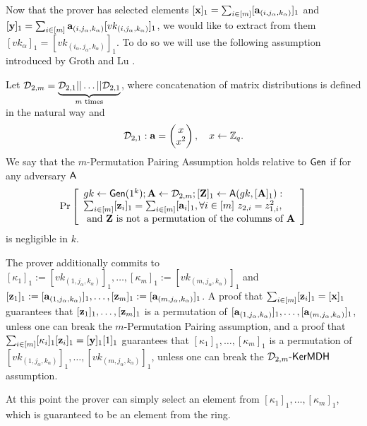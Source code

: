 Now that the prover has selected elements $[\mathbf{x}]_1=\sum_{i\in[m]}[\mathbf{a}_{(i,j_\alpha,k_\alpha)}]_1$ and $[\mathbf{y}]_1=\sum_{i\in[m]}\mathbf{a}_{(i,j_\alpha,k_\alpha)}[vk_{(i,j_\alpha,k_\alpha)}]_1$, we would like to extract from them  $[vk_\alpha]_1=[vk_{(i_\alpha,j_\alpha,k_\alpha)}]_1$. To do so we will use the following assumption introduced by Groth and Lu \cite{AC:GroLu07}.

\begin{definition}
Let $\mathcal{D}_{2,m}=\underbrace{\mathcal{D}_{2,1}||\ldots||\mathcal{D}_{2,1}}_{m\text{ times}}$, where concatenation of matrix distributions is defined in the natural way and 
$$\mathcal{D}_{2,1}: \mathbf{a}=\left(\begin{matrix}x\\x^2\end{matrix}\right),\quad x\gets\mathbb{Z}_q.$$
We say that the $m$-Permutation Pairing Assumption holds relative to $\mathsf{Gen}$ if for any adversary $\mathsf{A}$
$$
\Pr\left[
\begin{array}{l}
gk\gets\mathsf{Gen}(1^k);\mathbf{{A}}\gets\mathcal{D}_{2,m};[\mathbf{{Z}}]_1\gets\mathsf{A}(gk,[\mathbf{{A}}]_1):\\
\sum_{i\in[m]}[\mathbf{z}_i]_1=\sum_{i\in[m]}[\mathbf{a}_i]_1,\forall i\in[m]\ z_{2,i}=z_{1,i}^2,\\
\text{ and }\mathbf{{Z}}\text{ is not a permutation of the columns of }\mathbf{{A}}
\end{array}
\right]
$$
is negligible in $k$.
\end{definition}

The prover additionally commits to $[\kappa_1]_1:=[vk_{(1,j_\alpha,k_\alpha)}]_1,\ldots,[\kappa_m]_1:=[vk_{(m,j_\alpha,k_\alpha)}]_1$ and $[\mathbf{z}_1]_1:=[\mathbf{a}_{(1,j_\alpha,k_\alpha)}]_1,\ldots,[\mathbf{z}_m]_1:=[\mathbf{a}_{(m,j_\alpha,k_\alpha)}]_1$. A proof that $\sum_{i\in[m]}[\mathbf{z}_i]_1=[\mathbf{x}]_1$ guarantees that $[\mathbf{z}_1]_1,\ldots,[\mathbf{z}_m]_1$ is a permutation of $[\mathbf{a}_{(1,j_\alpha,k_\alpha)}]_1,\ldots,[\mathbf{a}_{(m,j_\alpha,k_\alpha)}]_1$, unless one can break the $m$-Permutation Pairing assumption, and a proof that $\sum_{i\in[m]}[\kappa_i]_1[\mathbf{z}_i]_1=[\mathbf{y}]_1[1]_1$ guarantees that $[\kappa_1]_1,\ldots,[\kappa_m]_1$ is a permutation of $[vk_{(1,j_\alpha,k_\alpha)}]_1,\ldots,[vk_{(m,j_\alpha,k_\alpha)}]_1$, unless one can break the $\mathcal{D}_{2,m}\mbox{-}\mathsf{KerMDH}$ assumption.

At this point the prover can simply select an element from $[\kappa_1]_1,\ldots,[\kappa_m]_1$, which is guaranteed to be an element from the ring.

